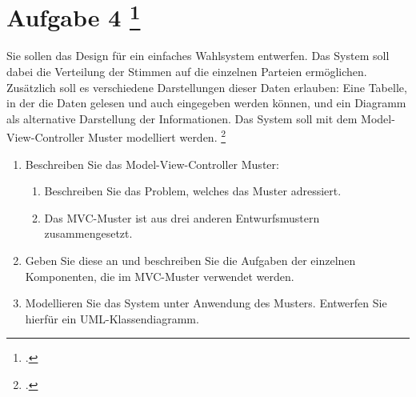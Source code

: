 \documentclass{lehramt-informatik-aufgabe}
\begin{document}

\section{Aufgabe 4
\footcite[Thema 2 Teilaufgabe 2 Aufgabe 2]{examen:66116:2014:09}}

Sie sollen das Design für ein einfaches Wahlsystem entwerfen. Das System
soll dabei die Verteilung der Stimmen auf die einzelnen Parteien
ermöglichen. Zusätzlich soll es verschiedene Darstellungen dieser Daten
erlauben: Eine Tabelle, in der die Daten gelesen und auch eingegeben
werden können, und ein Diagramm als alternative Darstellung der
Informationen. Das System soll mit dem Model-View-Controller Muster
modelliert werden.
\footcite{sosy:ab:6}

\begin{enumerate}


\item Beschreiben Sie das Model-View-Controller Muster:

\begin{enumerate}


\item Beschreiben Sie das Problem, welches das Muster adressiert.


\item Das MVC-Muster ist aus drei anderen Entwurfsmustern
zusammengesetzt.
\end{enumerate}

\item Geben Sie diese an und beschreiben Sie die Aufgaben der einzelnen
Komponenten, die im MVC-Muster verwendet werden.


\item Modellieren Sie das System unter Anwendung des Musters. Entwerfen
Sie hierfür ein UML-Klassendiagramm.

\end{enumerate}
\end{document}
